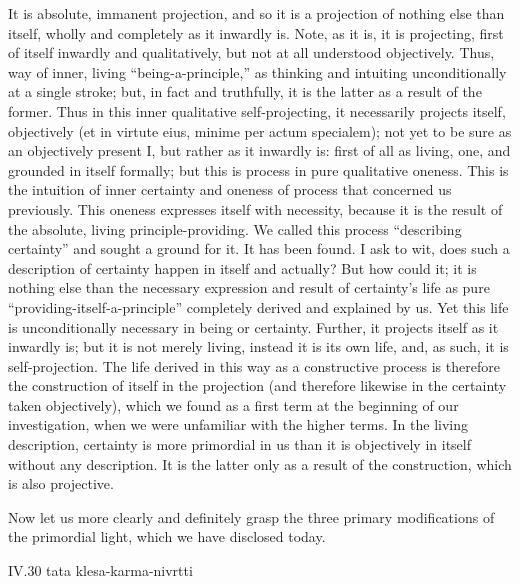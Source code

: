 It is absolute, immanent projection,
and so it is a projection of nothing else than itself,
wholly and completely as it inwardly is.
Note, as it is, it is projecting,
first of itself inwardly and qualitatively,
but not at all understood objectively.
Thus, way of inner, living “being-a-principle,”
as thinking and intuiting unconditionally at a single stroke;
but, in fact and truthfully, it is the latter as a result of the former.
Thus in this inner qualitative self-projecting,
it necessarily projects itself, objectively
(et in virtute eius, minime per actum specialem);
not yet to be sure as an objectively present I,
but rather as it inwardly is:
first of all as living, one, and grounded in itself formally;
but this is process in pure qualitative oneness.
This is the intuition of inner certainty
and oneness of process that concerned us previously.
This oneness expresses itself with necessity,
because it is the result of
the absolute, living principle-providing.
We called this process “describing certainty”
and sought a ground for it.
It has been found.
I ask to wit, does such a description of certainty
happen in itself and actually?
But how could it; it is nothing else than
the necessary expression and result of certainty's life
as pure “providing-itself-a-principle”
completely derived and explained by us.
Yet this life is unconditionally necessary in being or certainty.
Further, it projects itself as it inwardly is;
but it is not merely living, instead it is its own life,
and, as such, it is self-projection.
The life derived in this way as a constructive process is
therefore the construction of itself in the projection
(and therefore likewise in the certainty taken objectively),
which we found as a first term at the beginning of our investigation,
when we were unfamiliar with the higher terms.
In the living description, certainty is
more primordial in us than it is
objectively in itself without any description.
It is the latter only as
a result of the construction,
which is also projective.

Now let us more clearly and definitely grasp
the three primary modifications of the primordial light,
which we have disclosed today.

IV.30
tata klesa-karma-nivrtti

